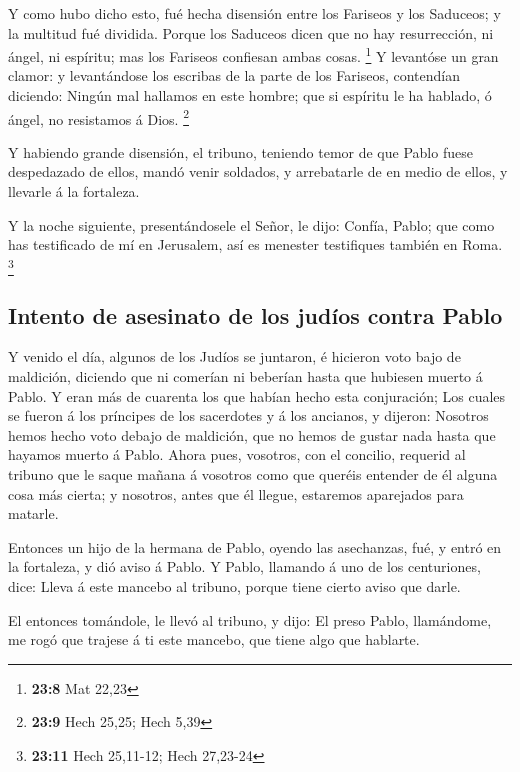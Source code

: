  Y como hubo dicho esto, fué hecha disensión entre los
Fariseos y los Saduceos; y la multitud fué dividida.  Porque
los Saduceos dicen que no hay resurrección, ni ángel, ni espíritu; mas
los Fariseos confiesan ambas cosas. \footnote{\textbf{23:8} Mat 22,23}
 Y levantóse un gran clamor: y levantándose los escribas de
la parte de los Fariseos, contendían diciendo: Ningún mal hallamos en
este hombre; que si espíritu le ha hablado, ó ángel, no resistamos á
Dios. \footnote{\textbf{23:9} Hech 25,25; Hech 5,39}

 Y habiendo grande disensión, el tribuno, teniendo temor de
que Pablo fuese despedazado de ellos, mandó venir soldados, y
arrebatarle de en medio de ellos, y llevarle á la fortaleza.

 Y la noche siguiente, presentándosele el Señor, le dijo:
Confía, Pablo; que como has testificado de mí en Jerusalem, así es
menester testifiques también en Roma. \footnote{\textbf{23:11} Hech
  25,11-12; Hech 27,23-24}

\hypertarget{intento-de-asesinato-de-los-juduxedos-contra-pablo}{%
\subsection{Intento de asesinato de los judíos contra
Pablo}\label{intento-de-asesinato-de-los-juduxedos-contra-pablo}}

 Y venido el día, algunos de los Judíos se juntaron, é
hicieron voto bajo de maldición, diciendo que ni comerían ni beberían
hasta que hubiesen muerto á Pablo.  Y eran más de cuarenta
los que habían hecho esta conjuración;  Los cuales se
fueron á los príncipes de los sacerdotes y á los ancianos, y dijeron:
Nosotros hemos hecho voto debajo de maldición, que no hemos de gustar
nada hasta que hayamos muerto á Pablo.  Ahora pues,
vosotros, con el concilio, requerid al tribuno que le saque mañana á
vosotros como que queréis entender de él alguna cosa más cierta; y
nosotros, antes que él llegue, estaremos aparejados para matarle.

 Entonces un hijo de la hermana de Pablo, oyendo las
asechanzas, fué, y entró en la fortaleza, y dió aviso á Pablo.
 Y Pablo, llamando á uno de los centuriones, dice: Lleva á
este mancebo al tribuno, porque tiene cierto aviso que darle.

 El entonces tomándole, le llevó al tribuno, y dijo: El
preso Pablo, llamándome, me rogó que trajese á ti este mancebo, que
tiene algo que hablarte.

